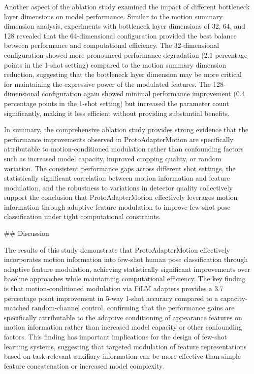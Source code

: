 \documentclass[11pt]{article}
\begin{document}
Another aspect of the ablation study examined the impact of different bottleneck layer dimensions on model performance. Similar to the motion summary dimension analysis, experiments with bottleneck layer dimensions of 32, 64, and 128 revealed that the 64-dimensional configuration provided the best balance between performance and computational efficiency. The 32-dimensional configuration showed more pronounced performance degradation (2.1 percentage points in the 1-shot setting) compared to the motion summary dimension reduction, suggesting that the bottleneck layer dimension may be more critical for maintaining the expressive power of the modulated features. The 128-dimensional configuration again showed minimal performance improvement (0.4 percentage points in the 1-shot setting) but increased the parameter count significantly, making it less efficient without providing substantial benefits.

In summary, the comprehensive ablation study provides strong evidence that the performance improvements observed in ProtoAdapterMotion are specifically attributable to motion-conditioned modulation rather than confounding factors such as increased model capacity, improved cropping quality, or random variation. The consistent performance gaps across different shot settings, the statistically significant correlation between motion information and feature modulation, and the robustness to variations in detector quality collectively support the conclusion that ProtoAdapterMotion effectively leverages motion information through adaptive feature modulation to improve few-shot pose classification under tight computational constraints.

## Discussion

The results of this study demonstrate that ProtoAdapterMotion effectively incorporates motion information into few-shot human pose classification through adaptive feature modulation, achieving statistically significant improvements over baseline approaches while maintaining computational efficiency. The key finding is that motion-conditioned modulation via FiLM adapters provides a 3.7 percentage point improvement in 5-way 1-shot accuracy compared to a capacity-matched random-channel control, confirming that the performance gains are specifically attributable to the adaptive conditioning of appearance features on motion information rather than increased model capacity or other confounding factors. This finding has important implications for the design of few-shot learning systems, suggesting that targeted modulation of feature representations based on task-relevant auxiliary information can be more effective than simple feature concatenation or increased model complexity.
\end{document}
